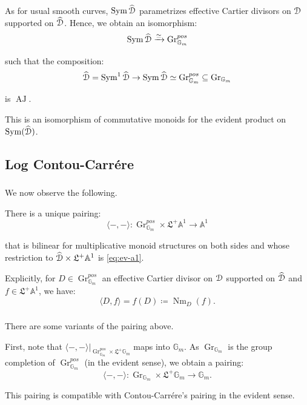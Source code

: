 \documentclass[reqno,11pt]{amsart}
\numberwithin{equation}{subsection}
\theoremstyle{remark}
\newcommand{\xar}[1]{\xrightarrow{#1}}
\newcommand{\rar}[1]{\xar{#1}}
\newcommand{\isom}{\rar{\simeq}}
\newcommand{\bA}{{\mathbb A}}
\newcommand{\bG}{{\mathbb G}}
\newcommand{\sD}{{\EuScript D}}
\newcommand{\fL}{{\mathfrak L}}
\newcommand{\on}{\operatorname}
\newcommand{\Gr}{\on{Gr}}
\newcommand{\Sym}{\on{Sym}}
\newcommand{\Nm}{\on{Nm}}
\newcommand{\AJ}{\on{AJ}}
\renewcommand{\subset}{\subseteq}
\newcommand{\pair}[2]{\langle #1,#2 \rangle}
\begin{document}
As for usual smooth curves, $\Sym\widehat{\sD}$ parametrizes
effective Cartier divisors on $\sD$ supported on $\widehat{\sD}$.
Hence, we obtain an isomorphism:
%
\[
\Sym\widehat{\sD} \isom \Gr_{\bG_m}^{pos}
\]

\noindent such that the composition:
%
\[
\widehat{\sD} = \Sym^1 \widehat{\sD} \to 
\Sym\widehat{\sD} \simeq \Gr_{\bG_m}^{pos}
\subset \Gr_{\bG_m}
\]

\noindent is $\AJ$.

This is an isomorphism of commutative monoids for the
evident product on $\Sym(\widehat{\sD})$.

\subsection{Log Contou-Carr\'ere}

\subsubsection{}

We now observe the following.

There is a unique pairing:
%
\[
\pair{-}{-}:\Gr_{\bG_m}^{pos} \times \fL^+ \bA^1 \to \bA^1
\]

\noindent that is bilinear for multiplicative monoid
structures on both sides and whose restriction 
to $\widehat{\sD} \times \fL^+ \bA^1$ is 
\eqref{eq:ev-a1}. 

Explicitly, for $D \in \Gr_{\bG_m}^{pos}$ an effective 
Cartier divisor
on $\sD$ supported on $\widehat{\sD}$ and 
$f\in \fL^+ \bA^1$, we have:
%
\[
\pair{D}{f} = f(D) \coloneqq \Nm_D(f).
\]

\subsubsection{}

There are some variants of the pairing above.

First, note that 
$\pair{-}{-}|_{\Gr_{\bG_m}^{pos} \times \fL^+ \bG_m}$
maps into $\bG_m$. As $\Gr_{\bG_m}$ is the group completion
of $\Gr_{\bG_m}^{pos}$ (in the evident sense), we obtain a 
pairing:
%
\[
\pair{-}{-}:\Gr_{\bG_m} \times \fL^+ \bG_m \to 
\bG_m.
\]

\noindent This pairing is compatible with Contou-Carr\'ere's
pairing \cite{cc} in the evident sense.

\subsubsection{}
\end{document}
